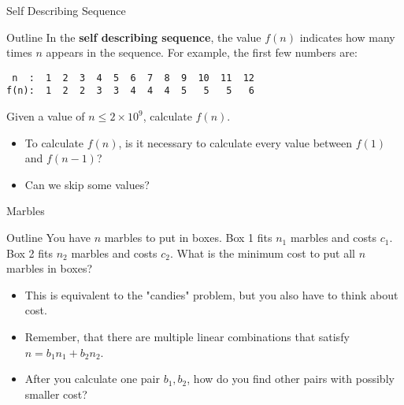 \begin{frame}[fragile]{Self Describing Sequence}
  \begin{block}{Outline}
    In the {\bf self describing sequence}, the value $f(n)$ indicates how many times $n$ appears in the sequence. For example, the first few numbers are:

    \begin{verbatim}
 n  :  1  2  3  4  5  6  7  8  9  10  11  12
f(n):  1  2  2  3  3  4  4  4  5   5   5   6
    \end{verbatim}

    Given a value of $n \leq 2\times10^9$, calculate $f(n)$.
  \end{block}\bigskip

  \begin{itemize}
    \item To calculate $f(n)$, is it necessary to calculate every value between $f(1)$ and $f(n-1)$?
    \item Can we skip some values?
  \end{itemize}
\end{frame}

\begin{frame}{Marbles}
  \begin{block}{Outline}
    You have $n$ marbles to put in boxes. Box 1 fits $n_1$ marbles and costs $c_1$. Box 2 fits $n_2$ marbles and costs $c_2$. What is the minimum cost to put all $n$ marbles in boxes?
  \end{block}\bigskip

  \begin{itemize}
    \item This is equivalent to the "candies" problem, but you also have to think about cost.
    \item Remember, that there are multiple linear combinations that satisfy $n = b_1n_1 + b_2n_2$.
    \item After you calculate one pair $b_1,b_2$, how do you find other pairs with possibly smaller cost?
  \end{itemize}
\end{frame}


%
